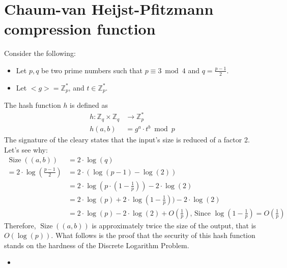 \section{Chaum-van Heijst-Pfitzmann compression function}
Consider the following:
\begin{itemize}
    \item Let $p, q$ be two prime numbers such that $p \equiv 3 \bmod 4$ and $q = \frac{p-1}{2}$.
    \item Let $<g> = \mathbb{Z}_{p}^{*}$, and $t \in \mathbb{Z}_{p}^{*}$.
\end{itemize}
The hash function $h$ is defined as
\begin{align*}
    h: \mathbb{Z}_{q} \times \mathbb{Z}_{q} &\rightarrow \mathbb{Z}_{p}^{*}\\
    h(a, b) &= g^{a} \cdot t^{b} \bmod p
\end{align*}
The signature of the cleary states that the input's size is reduced of a factor 2. Let's see why:
\begin{align*}
    \operatorname{Size}((a,b)) &= 2 \cdot \operatorname{log}(q)\\
    = 2 \cdot \operatorname{log}(\frac{p-1}{2}) &= 2 \cdot (\operatorname{log}(p-1) - \operatorname{log}(2))\\
    &= 2 \cdot \operatorname{log}(p \cdot (1 - \frac{1}{p})) - 2 \cdot \operatorname{log}(2)\\
    &= 2 \cdot \operatorname{log}(p) + 2 \cdot \operatorname{log}(1 - \frac{1}{p})) - 2 \cdot \operatorname{log}(2)\\
    &= 2 \cdot \operatorname{log}(p) - 2 \cdot \operatorname{log}(2) + O(\frac{1}{p}) \text{, Since } \operatorname{log}(1 - \frac{1}{p}) = O(\frac{1}{p})
\end{align*}
Therefore, $\operatorname{Size}((a,b))$ is approximately twice the size of the output, that is $O(\operatorname{log}(p))$.\newline
What follows is the proof that the security of this hash function stands on the hardness of the Discrete Logarithm Problem.
\begin{itemize}
    \item
\end{itemize}
